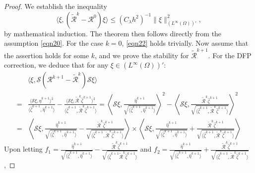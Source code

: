 \documentclass[10pt,a4paper]{amsart}
\begin{document}
\begin{proof}
We establish the inequality
\begin{equation}\label{eqn22}
\langle \xi, (\widetilde{\mathcal{R}}^{k}-\mathcal{R}^{0})\xi\rangle \leq (C_{\lambda}h^{2})^{-1}\|\xi\|_{(L^{\infty}(\Omega))'}^{2},
\end{equation}
by mathematical induction. The theorem then follows directly from the assumption \eqref{eqn20}.
For the case $k=0$, \eqref{eqn22} holds trivially.
Now assume that the assertion holds for some $k$, and we prove the stability for $\widetilde{\mathcal{R}}^{k+1}$.
For the DFP correction, we deduce that for any $\xi \in (L^{\infty}(\Omega))'$:
\begin{align*}
{}&\langle \xi, \mathcal{S}(\mathcal{R}^{k+1} - \widetilde{\mathcal{R}}^{k})\mathcal{S}\xi \rangle \\
=& \frac{\langle \mathcal{S}\xi, \hat{\eta}^{k+1} \rangle^{2}}{\langle \hat{\zeta}^{k+1}, \hat{\eta}^{k+1} \rangle} - \frac{\langle \mathcal{S}\xi, \widetilde{\mathcal{R}}^{k}\hat{\zeta}^{k+1} \rangle^{2}}{\langle \hat{\zeta}^{k+1}, \widetilde{\mathcal{R}}^{k}\hat{\zeta}^{k+1} \rangle}
= \left\langle \mathcal{S}\xi, \frac{\hat{\eta}^{k+1}}{\sqrt{\langle \hat{\zeta}^{k+1}, \hat{\eta}^{k+1} \rangle}} \right\rangle^{2} - \left\langle \mathcal{S}\xi, \frac{\widetilde{\mathcal{R}}^{k}\hat{\zeta}^{k+1}}{\sqrt{\langle \hat{\zeta}^{k+1}, \widetilde{\mathcal{R}}^{k}\hat{\zeta}^{k+1} \rangle}} \right\rangle^{2} \\
=& \left\langle \mathcal{S}\xi, \frac{\hat{\eta}^{k+1}}{\sqrt{\langle \hat{\zeta}^{k+1}, \hat{\eta}^{k+1} \rangle}} - \frac{\widetilde{\mathcal{R}}^{k}\hat{\zeta}^{k+1}}{\sqrt{\langle \hat{\zeta}^{k+1}, \widetilde{\mathcal{R}}^{k}\hat{\zeta}^{k+1} \rangle}} \right\rangle
{} \times \left\langle \mathcal{S}\xi, \frac{\hat{\eta}^{k+1}}{\sqrt{\langle \hat{\zeta}^{k+1}, \hat{\eta}^{k+1} \rangle}} + \frac{\widetilde{\mathcal{R}}^{k}\hat{\zeta}^{k+1}}{\sqrt{\langle \hat{\zeta}^{k+1}, \widetilde{\mathcal{R}}^{k}\hat{\zeta}^{k+1} \rangle}} \right\rangle 
\end{align*}
Upon letting
$f_{1}= \frac{\hat{\eta}^{k+1}}{\sqrt{\langle \hat{\zeta}^{k+1}, \hat{\eta}^{k+1} \rangle}} - \frac{\widetilde{\mathcal{R}}^{k}\hat{\zeta}^{k+1}}{\sqrt{\langle \hat{\zeta}^{k+1} \widetilde{\mathcal{R}}^{k}\hat{\zeta}^{k+1} \rangle}}$ and $
f_{2}=\frac{\hat{\eta}^{k+1}}{\sqrt{\langle \hat{\zeta}^{k+1}, \hat{\eta}^{k+1} \rangle}} + \frac{\widetilde{\mathcal{R}}^{k}\hat{\zeta}^{k+1}}{\sqrt{\langle \hat{\zeta}^{k+1}, \widetilde{\mathcal{R}}^{k}\hat{\zeta}^{k+1} \rangle}}$,

\end{proof}
\end{document}

